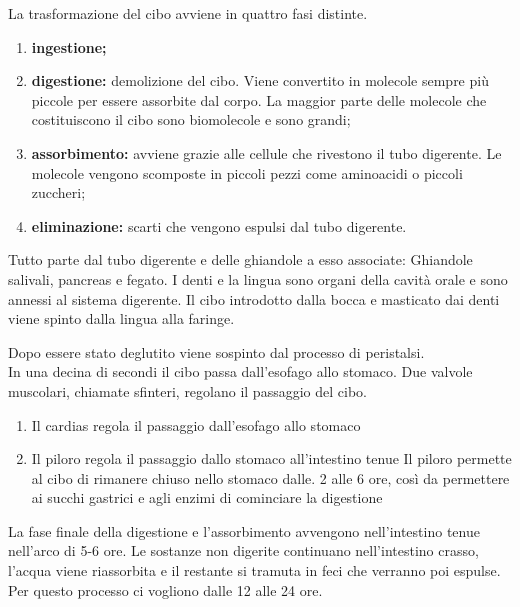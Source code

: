 \documentclass[a4paper]{article}
\begin{document}
La trasformazione del cibo avviene in quattro fasi distinte.
\begin{enumerate}
    \item \textbf{ingestione;}
    \item \textbf{digestione:} demolizione del cibo. Viene convertito in molecole sempre più piccole per essere
    assorbite dal corpo. La maggior parte delle molecole che costituiscono il cibo sono
    biomolecole e sono grandi;
    \item \textbf{assorbimento:} avviene grazie alle cellule che rivestono il tubo digerente.
    Le molecole vengono scomposte in piccoli pezzi come aminoacidi o piccoli zuccheri;
    \item \textbf{eliminazione:} scarti che vengono
    espulsi dal tubo digerente.
\end{enumerate}

Tutto parte dal tubo digerente e delle ghiandole a esso associate:
Ghiandole salivali, pancreas e fegato. I denti e la lingua sono organi
della cavità orale e sono annessi al sistema digerente.
Il cibo introdotto dalla bocca e masticato dai denti viene spinto dalla
lingua alla faringe.


Dopo essere stato deglutito viene sospinto dal
processo di peristalsi.
\\
In una decina di secondi il cibo passa dall'esofago allo stomaco. Due
valvole muscolari, chiamate sfinteri, regolano il passaggio del cibo.

\begin{enumerate}
    \item Il cardias regola il passaggio dall'esofago allo stomaco
    \item Il piloro regola il passaggio dallo stomaco all'intestino tenue
    Il piloro permette al cibo di rimanere chiuso nello stomaco dalle.
    2 alle 6 ore, così da permettere ai succhi gastrici e agli enzimi
    di cominciare la digestione
\end{enumerate}

La fase finale della digestione e l'assorbimento avvengono
nell'intestino tenue nell'arco di 5-6 ore. Le sostanze non digerite
continuano nell'intestino crasso, l'acqua viene riassorbita e il restante
si tramuta in feci che verranno poi espulse. Per questo processo ci
vogliono dalle 12 alle 24 ore.
\end{document}
